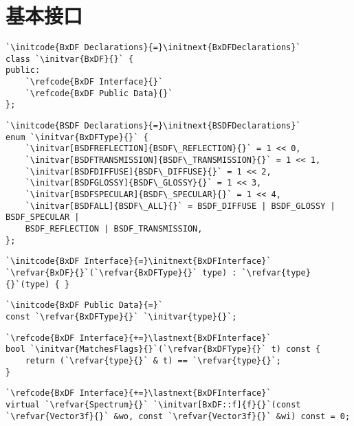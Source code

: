 \section{基本接口}\label{sec:基本接口}

\begin{lstlisting}
`\initcode{BxDF Declarations}{=}\initnext{BxDFDeclarations}`
class `\initvar{BxDF}{}` {
public:
    `\refcode{BxDF Interface}{}`
    `\refcode{BxDF Public Data}{}`
};
\end{lstlisting}

\begin{lstlisting}
`\initcode{BSDF Declarations}{=}\initnext{BSDFDeclarations}`
enum `\initvar{BxDFType}{}` {
    `\initvar[BSDFREFLECTION]{BSDF\_REFLECTION}{}` = 1 << 0,
    `\initvar[BSDFTRANSMISSION]{BSDF\_TRANSMISSION}{}` = 1 << 1,
    `\initvar[BSDFDIFFUSE]{BSDF\_DIFFUSE}{}` = 1 << 2,
    `\initvar[BSDFGLOSSY]{BSDF\_GLOSSY}{}` = 1 << 3,
    `\initvar[BSDFSPECULAR]{BSDF\_SPECULAR}{}` = 1 << 4,
    `\initvar[BSDFALL]{BSDF\_ALL}{}` = BSDF_DIFFUSE | BSDF_GLOSSY | BSDF_SPECULAR |
    BSDF_REFLECTION | BSDF_TRANSMISSION,
};
\end{lstlisting}

\begin{lstlisting}
`\initcode{BxDF Interface}{=}\initnext{BxDFInterface}`
`\refvar{BxDF}{}`(`\refvar{BxDFType}{}` type) : `\refvar{type}{}`(type) { }
\end{lstlisting}

\begin{lstlisting}
`\initcode{BxDF Public Data}{=}`
const `\refvar{BxDFType}{}` `\initvar{type}{}`;
\end{lstlisting}

\begin{lstlisting}
`\refcode{BxDF Interface}{+=}\lastnext{BxDFInterface}`
bool `\initvar{MatchesFlags}{}`(`\refvar{BxDFType}{}` t) const {
    return (`\refvar{type}{}` & t) == `\refvar{type}{}`;
}
\end{lstlisting}

\begin{lstlisting}
`\refcode{BxDF Interface}{+=}\lastnext{BxDFInterface}`
virtual `\refvar{Spectrum}{}` `\initvar[BxDF::f]{f}{}`(const `\refvar{Vector3f}{}` &wo, const `\refvar{Vector3f}{}` &wi) const = 0;
\end{lstlisting}